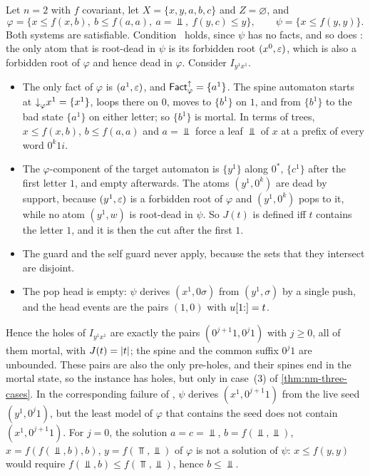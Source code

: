 \begin{example}
Let $n=2$ with $f$ covariant, let $X=\{x,y,a,b,c\}$ and $Z=\varnothing$, and
\[
 \varphi=\{x\le f(x,b),\ b\le f(a,a),\ a=\Bot,\ f(y,c)\le y\},\qquad
 \psi=\{x\le f(y,y)\}.
\]
Both systems are satisfiable. Condition \CondI\ holds, since $\psi$ has no
facts, and so does \CondU: the only atom that is root-dead in $\psi$ is its
forbidden root $(x^0,\varepsilon)$, which is also a forbidden root of $\varphi$ and
hence dead in $\varphi$. Consider $I_{y^1x^1}$.
\begin{itemize}[leftmargin=*]
\item The only fact of $\varphi$ is $(a^1,\varepsilon)$, and $\mathsf{Fact}^{\uparrow}_{\varphi}=\{a^1\}$.
  The spine automaton starts at $\mathord{\downarrow}_{\varphi}{x^1}=\{x^1\}$, loops there on
  $0$, moves to $\{b^1\}$ on $1$, and from $\{b^1\}$ to the bad state
  $\{a^1\}$ on either letter; so $\{b^1\}$ is mortal. In terms of trees,
  $x\le f(x,b)$, $b\le f(a,a)$ and $a=\Bot$ force a leaf $\Bot$ of $x$ at a
  prefix of every word $0^k1i$.
\item The $\varphi$-component of the target automaton is $\{y^1\}$ along
  $0^*$, $\{c^1\}$ after the first letter $1$, and empty afterwards. The atoms
  $(y^1,0^k)$ are dead by support, because $(y^1,\varepsilon)$ is a forbidden root of
  $\varphi$ and $(y^1,0^k)$ pops to it, while no atom $(y^1,w)$ is root-dead
  in $\psi$. So $J(t)$ is defined iff $t$ contains the letter $1$, and it is
  then the cut after the first $1$.
\item The guard and the self guard never apply, because the sets that they
  intersect are disjoint.
\item The pop head is empty: $\psi$ derives $(x^1,0\sigma)$ from
  $(y^1,\sigma)$ by a single push, and the head events are the pairs $(1,0)$
  with $u[1{:}]=t$.
\end{itemize}
Hence the holes of $I_{y^1x^1}$ are exactly the pairs $(0^{j+1}1,0^j1)$ with
$j\ge0$, all of them mortal, with $J(t)=\lvert t\rvert$; the spine and the common
suffix $0^j1$ are unbounded. These pairs are also the only pre-holes, and their
spines end in the mortal state, so the instance has holes, but only in case~(3)
of \cref{thm:nm-three-cases}. In the corresponding failure of \CondII, $\psi$
derives $(x^1,0^{j+1}1)$ from the live seed $(y^1,0^j1)$, but the least model
of $\varphi$ that contains the seed does not contain $(x^1,0^{j+1}1)$. For
$j=0$, the solution $a=c=\Bot$, $b=f(\Bot,\Bot)$, $x=f(f(\Bot,b),b)$,
$y=f(\Top,\Bot)$ of $\varphi$ is not a solution of $\psi$: $x\le f(y,y)$ would
require $f(\Bot,b)\le f(\Top,\Bot)$, hence $b\le\Bot$.
\end{example}

